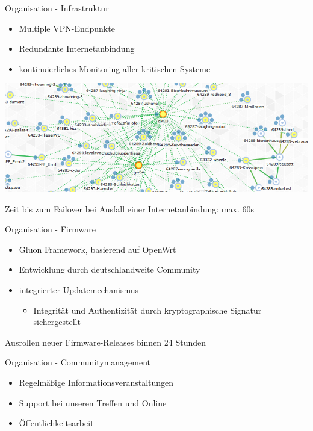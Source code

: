 \documentclass{beamer}
\begin{document}
\begin{frame}{Organisation - Infrastruktur}
\vfill
\begin{itemize}
	\item Multiple VPN-Endpunkte
	\item Redundante Internetanbindung
	\item kontinuierliches Monitoring aller kritischen Systeme
\end{itemize}
\begin{center}
\includegraphics[width=\textwidth]{images/2015-01-28-graph}
\end{center}
\vfill
Zeit bis zum Failover bei Ausfall einer Internetanbindung: max. 60s
\vfill
\end{frame}

\begin{frame}{Organisation - Firmware}
\vfill
\begin{itemize}
	\item Gluon Framework, basierend auf OpenWrt
	\item Entwicklung durch deutschlandweite Community
	\item integrierter Updatemechanismus
	\begin{itemize}
		\item Integrität und Authentizität durch kryptographische Signatur sichergestellt
	\end{itemize}
\end{itemize}
\vfill
Ausrollen neuer Firmware-Releases binnen 24 Stunden
\vfill
\end{frame}
	
\begin{frame}{Organisation - Communitymanagement}
\vfill
\begin{itemize}
\item Regelmäßige Informationsveranstaltungen
\item Support bei unseren Treffen und Online
\item Öffentlichkeitsarbeit
\end{itemize}
\vfill
\end{frame}
\end{document}
